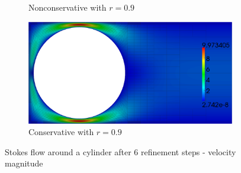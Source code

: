\documentclass[letterpaper]{article}
\begin{document}
\begin{figure}[p]
\begin{subfigure}[t]{0.5\textwidth}
\caption{Nonconservative with $r=0.9$}
\label{fig:stokesCylinderNC9}
\end{subfigure}
\begin{subfigure}[t]{0.5\textwidth}
\centering
\includegraphics[width=\textwidth]{figs/StokesCylinder/umag9_C6.png}
\caption{Conservative with $r=0.9$}
\label{fig:stokesCylinderC9}
\end{subfigure}
\caption{Stokes flow around a cylinder after 6 refinement steps - velocity magnitude}
\label{fig:stokesCylinder9}
\end{figure}
\end{document}
